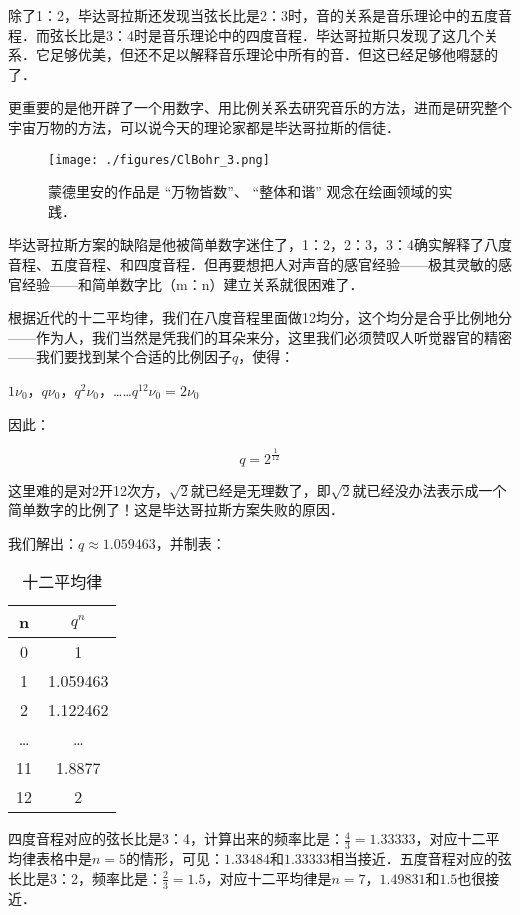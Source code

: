 除了1：2，毕达哥拉斯还发现当弦长比是2：3时，音的关系是音乐理论中的五度音程．而弦长比是3：4时是音乐理论中的四度音程．毕达哥拉斯只发现了这几个关系．它足够优美，但还不足以解释音乐理论中所有的音．但这已经足够他嘚瑟的了．

更重要的是他开辟了一个用数字、用比例关系去研究音乐的方法，进而是研究整个宇宙万物的方法，可以说今天的理论家都是毕达哥拉斯的信徒．

\begin{figure}[ht]
\centering
\texttt{[image: ./figures/ClBohr\_3.png]}
\caption{蒙德里安的作品是 “万物皆数”、 “整体和谐” 观念在绘画领域的实践．} \label{ClBohr_fig3}
\end{figure}

毕达哥拉斯方案的缺陷是他被简单数字迷住了，1：2，2：3，3：4确实解释了八度音程、五度音程、和四度音程．但再要想把人对声音的感官经验——极其灵敏的感官经验——和简单数字比（m：n）建立关系就很困难了．

根据近代的十二平均律，我们在八度音程里面做12均分，这个均分是合乎比例地分——作为人，我们当然是凭我们的耳朵来分，这里我们必须赞叹人听觉器官的精密——我们要找到某个合适的比例因子$q$，使得：

$1 \nu_0$，$q \nu_0$，$q^2 \nu_0$，……$q^{12} \nu_0 =2 \nu_0$

因此：

\begin{equation}
q = 2^{\frac{1}{12}}
\end{equation}

这里难的是对2开12次方，$\sqrt{2}$就已经是无理数了，即$\sqrt{2}$就已经没办法表示成一个简单数字的比例了！这是毕达哥拉斯方案失败的原因．

我们解出：$q \approx 1.059463 $，并制表：

\begin{table}[ht]
\centering
\caption{⼗⼆平均律}\label{ClBohr_tab1}
\begin{tabular}{|c|c|}
\hline
n & $q^n$\\
\hline
0 & 1 \\
\hline
1& 1.059463 \\
\hline
2 & 1.122462 \\
\hline
… & … \\
\hline
11 & 1.8877 \\
\hline
12 & 2 \\
\hline
\end{tabular}
\end{table}


四度音程对应的弦长比是3：4，计算出来的频率比是：$\frac{4}{3} = 1.33333$，对应十二平均律表格中是$n = 5$的情形，可见：$1.33484$和$1.33333$相当接近．五度音程对应的弦长比是3：2，频率比是：$\frac{2}{3} = 1.5$，对应十二平均律是$n=7$，$1.49831$和$1.5$也很接近．

